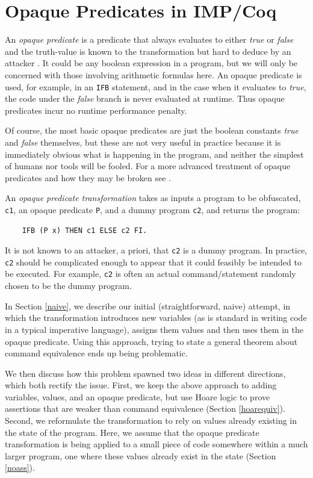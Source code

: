 \documentclass[compsoc,conference,a4paper,10pt,times]{IEEEtran}
\begin{document}
\section{Opaque Predicates in IMP/Coq}
\label{sec:opaque}
An \emph{opaque predicate} \cite{CoNa} is a predicate that always evaluates to either \emph{true} or \emph{false} and the truth-value is known to the transformation but hard to deduce by an attacker \cite{Prada}. It could be any boolean expression in a program, but we will only be concerned with those involving arithmetic formulas here. An opaque predicate is used, for example, in an \texttt{IFB} statement, and in the case when it evaluates to \emph{true}, the code under the \emph{false} branch is never evaluated at runtime.  Thus opaque predicates incur no runtime performance penalty.

Of course, the most basic opaque predicates are just the boolean constants \emph{true} and \emph{false} themselves, but these are not very useful in practice because it is immediately obvious what is happening in the program, and neither the simplest of humans nor tools will be fooled. For a more advanced treatment of opaque predicates and how they may be broken see \cite{Prada}.

An \emph{opaque predicate transformation} takes as inputs a program to be obfuscated, \texttt{c1}, an opaque predicate \texttt{P}, and a dummy program \texttt{c2}, and returns the program:
\begin{verbatim}
    IFB (P x) THEN c1 ELSE c2 FI.
\end{verbatim}
It is not known to an attacker, a priori, that \texttt{c2} is a dummy program. In practice, \texttt{c2} should be complicated enough to appear that it could feasibly be intended to be executed. For example, \texttt{c2} is often an actual command/statement randomly chosen to be the dummy program.

In Section \ref{naive}, we describe our initial (straightforward, naive) attempt, in which the transformation introduces new variables (as is standard in writing code in a typical imperative language), assigns them values and then uses them in the opaque predicate.  Using this approach, trying to state a general theorem about command equivalence ends up being problematic.  

We then discuss how this problem spawned two ideas in different directions, which both rectify the issue. First, we keep the above approach to adding variables, values, and an opaque predicate, but use Hoare logic to prove assertions that are weaker than command equivalence (Section \ref{hoarequiv}).
Second, we reformulate the transformation to rely on values already existing in the state of the program. Here, we assume that the opaque predicate transformation is being applied to a small piece of code somewhere within a much larger program, one where these values already exist in the state (Section \ref{noass}).
\end{document}
